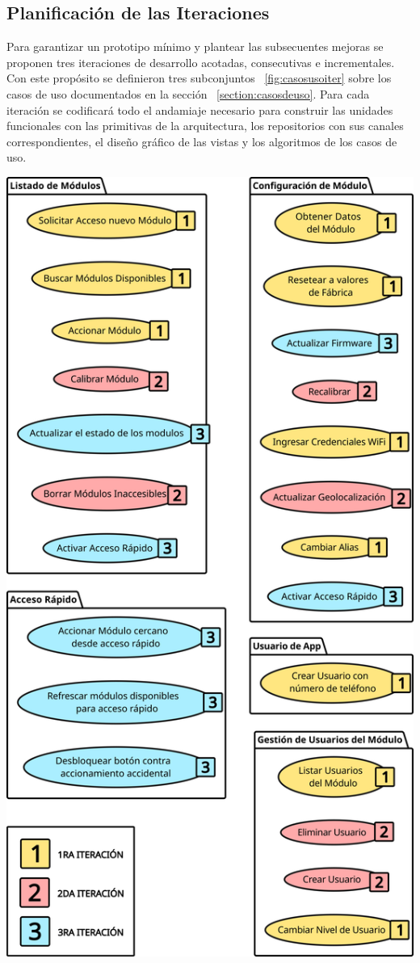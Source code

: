  
\subsection{Planificación de las Iteraciones}

Para garantizar un prototipo mínimo y plantear las subsecuentes mejoras se proponen tres iteraciones de desarrollo acotadas, consecutivas e incrementales. Con este propósito se definieron tres subconjuntos ~\ref{fig:casosusoiter} sobre los casos de uso documentados en la sección ~\ref{section:casosdeuso}. Para cada iteración se codificará todo el andamiaje necesario para construir las unidades funcionales con las primitivas de la arquitectura, los repositorios con sus canales correspondientes, el diseño gráfico de las vistas y los algoritmos de los casos de uso.
\pagebreak
\begin{multicols}{2}
	\begin{Figure}%
		\centering
		\includegraphics[width=\linewidth]{Figures/design/USE_todos_iterac.png}

\end{Figure}
\end{multicols}
